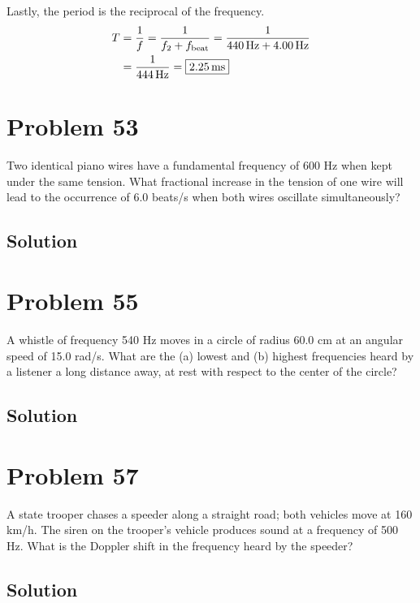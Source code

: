 \documentclass[12pt]{article}
\begin{document}
            Lastly, the period is the reciprocal of the frequency.
            \begin{align}
                T   &=  \frac{1}{f}
                    =   \frac{1}{f_2 + f_{\rm beat}}
                    =   \frac{1}{440\,\unit{\hertz} + 4.00\,\unit{\hertz}}\\
                    &=  \frac{1}{444\,\unit{\hertz}}
                    =   \boxed{2.25\,\unit{\milli\second}}
            \end{align}

    \pagebreak
    \section{Problem 53}
        Two identical piano wires have a fundamental frequency of 600 Hz when kept under the same tension. 
        What fractional increase in the tension of one wire will lead to the occurrence of 6.0 beats/s when both wires oscillate simultaneously?

        \subsection{Solution}

    \pagebreak
    \section{Problem 55}
        A whistle of frequency 540 Hz moves in a circle of radius 60.0 cm at an angular speed of 15.0 rad/s. 
        What are the (a) lowest and (b) highest frequencies heard by a listener a long distance away, at rest with respect to the center of the circle?

        \subsection{Solution}

    \pagebreak
    \section{Problem 57}
        A state trooper chases a speeder along a straight road; both vehicles move at 160 km/h. 
        The siren on the trooper's vehicle produces sound at a frequency of 500 Hz. 
        What is the Doppler shift in the frequency heard by the speeder?

        \subsection{Solution}
\end{document}
